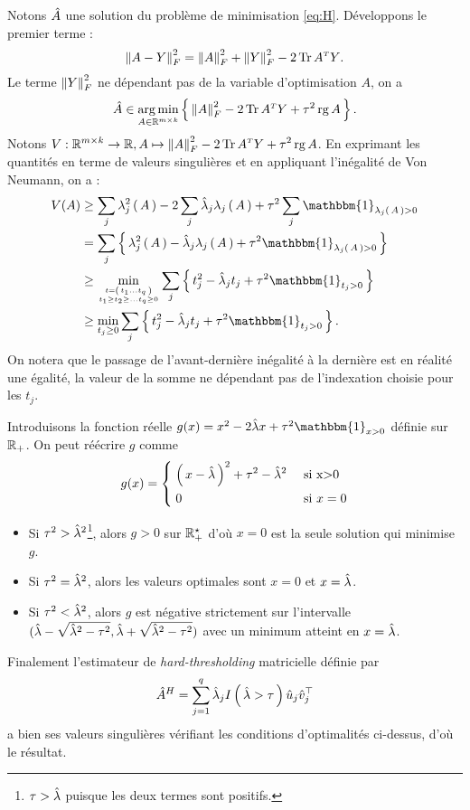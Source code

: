 \begin{sol}
 Notons $\hat{A}$ une solution du problème de minimisation \eqref{eq:H}.
 Développons le premier terme :
 $$\norme{A-Y}_F^2 = \norme{A}_F^2+\norme{Y}_F^2-2 \tr{\transpose{A}Y}.$$
 Le terme $\norme{Y}_F^2$ ne dépendant pas de la variable d'optimisation $A$, on a
 $$
  \Aestim \in \argmin _ { A \in \mathbb { R } ^ { m \times k } } \acc{ \norme{A}_F^2
   -2 \tr{\transpose{A}Y} + \tau ^ { 2 } \rg A }.
 $$
 Notons $ \displaystyle V: \R^{m \times k} \rightarrow \R, A \mapsto \norme{A}_F^2
  -2 \tr{\transpose{A}Y} + \tau ^ { 2 } \rg A$. En exprimant les quantités en terme
 de valeurs singulières et en appliquant l'inégalité de Von Neumann, on a :
 \begin{align*}
  V(A) & \geq  \sum_j
  \lambda_j^2\prt{A} -2 \sum_j \lestim_j \lambda_j \prt{A} + \tau^2 \sum_j \mathbbm{1}_{\lambda_j\prt{A}>0}                                              \\
       & = \sum_j \acc{\lambda_j^2\prt{A} - \lestim_j \lambda_j \prt{A} + \tau^2 \mathbbm{1}_{\lambda_j\prt{A}>0}} \\
       & \geq \min_{t = \prt{t_1 \ldots t_q} \atop t_1 \geq t_2 \geq \ldots
   t_q \geq 0} \sum_j \acc{t_j^2 - \lestim_j t_j + \tau^2 \mathbbm{1}_{t_j>0}}                                     \\
       & \geq \min_{t_j \geq 0} \sum_j \acc{t_j^2 - \lestim_j t_j + \tau^2 \mathbbm{1}_{t_j>0}}.
 \end{align*}
 On notera que le passage de l'avant-dernière inégalité à la dernière est en
 réalité une égalité, la valeur de la somme  ne dépendant pas de
 l'indexation choisie pour les $t_j$.


 Introduisons la fonction réelle $g(x) = x^2-2 \lestim x + \tau^2 \mathbbm{1}_{x>0}$ définie sur $\mathbb{R}_{+}$.
 On peut réécrire $g$ comme
 $$ g(x)=
  \begin{dcases}
   \; \left( \, x-\hat{\lambda} \, \right)^2 + \tau^2-\hat{\lambda}^2 & \text{ si x>0}    \\
   \; 0                                    & \text{ si } x = 0
  \end{dcases}
 $$
 \begin{itemize}[font= \color{blue} \Large, label= $\bullet$]
  \item Si $\tau^2>\hat{\lambda}^2$\footnote{\ie \; $ \displaystyle \tau>\hat{\lambda}$ puisque les deux termes sont positifs.},  alors $g>0$ sur $\R_{+}^{\star}$ d'où $x = 0$ est
        la seule solution qui minimise $g$.
  \item Si $\tau^2 = \hat{\lambda}^2$, alors les valeurs optimales sont $x = 0$ et $x = \hat{\lambda}$.
  \item Si $\tau^2< \hat{\lambda}^2$, alors $g$ est négative strictement sur l'intervalle
        $(\hat{\lambda}-\sqrt{\hat{\lambda}^2-\tau^2}, \hat{\lambda}+\sqrt{\hat{\lambda}^2-\tau^2})$
        avec un minimum atteint en $x = \hat{\lambda}$.
 \end{itemize}
 Finalement l'estimateur de \textit{hard-thresholding} matricielle définie par
 $$\hat{A}^H =  \sum _ { j = 1 } ^ { q }  \hat{\lambda}_j I\left( \, \hat{\lambda}>\tau \, \right)
  \hat { u } _ { j } \hat { v } _ { j } ^ { \top }$$
 a bien ses valeurs singulières vérifiant les conditions d'optimalités ci-dessus,
 d'où le résultat.
\end{sol}
